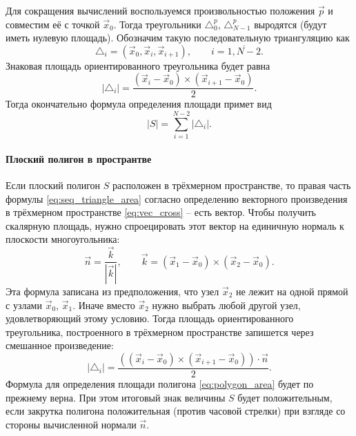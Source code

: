 Для сокращения вычислений воспользуемся произвольностью положения $\vec p$ и совместим
её с точкой $\vec x_0$. Тогда треугольники $\triangle^p_0$, $\triangle^p_{N-1}$
выродятся (будут иметь нулевую площадь).
Обозначим такую последовательную триангуляцию как
\begin{equation}
\label{eq:seq_polygon_triangulation}
\triangle_i = (\vec x_0, \vec x_i, \vec x_{i+1}), \qquad i=\overline{1,N-2}.
\end{equation}
Знаковая площадь ориентированного треугольника будет равна
\begin{equation}
\label{eq:seq_triangle_area}
|\triangle_i| = \frac{(\vec x_i - \vec x_0) \times (\vec x_{i+1} - \vec x_0)}{2}.
\end{equation}
Тогда окончательно формула определения площади примет вид
\begin{equation}
\label{eq:polygon_area}
|S| = \sum_{i=1}^{N-2}|\triangle_i|.
\end{equation}

\paragraph{Плоский полигон в пространтве} Если плоский полигон $S$ расположен в трёхмерном пространстве,
то правая часть формулы \cref{eq:seq_triangle_area} согласно определению векторного произведения в трёхмерном пространстве \cref{eq:vec_cross}
-- есть вектор.
Чтобы получить скалярную площадь, нужно спроецировать этот вектор на единичную нормаль к плоскости
многоугольника:
$$
\vec n = \frac{\vec k}{|\vec k|}, \qquad \vec k = (\vec x_1 - \vec x_0) \times (\vec x_2 - \vec x_0).
$$
Эта формула записана из предположения, что узел $\vec x_2$ не лежит
на одной прямой с узлами $\vec x_0$, $\vec x_1$. Иначе вместо $\vec x_2$ нужно
выбрать любой другой узел, удовлетворяющий этому условию.
Тогда площадь ориентированного треугольника, построенного
в трёхмерном пространстве запишется через смешанное произведение:
\begin{equation}
\label{eq:seq_triangle_area_3d}
|\triangle_i| = \frac{\left((\vec x_i - \vec x_0) \times (\vec x_{i+1} - \vec x_0) \right)\cdot \vec n}{2}.
\end{equation}
Формула для определения площади полигона \cref{eq:polygon_area} будет по прежнему верна.
При этом итоговый знак величины $S$ будет положительным,
если закрутка полигона положительная (против часовой стрелки) при взгляде со стороны
вычисленной нормали $\vec n$.

